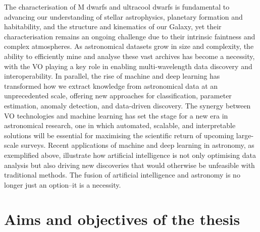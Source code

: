 The characterisation of M dwarfs and ultracool dwarfs is fundamental to advancing our understanding of stellar astrophysics, planetary formation and habitability, and the structure and kinematics of our Galaxy, yet their characterisation remains an ongoing challenge due to their intrinsic faintness and complex atmospheres. As astronomical datasets grow in size and complexity, the ability to efficiently mine and analyse these vast archives has become a necessity, with the VO playing a key role in enabling multi-wavelength data discovery and interoperability. In parallel, the rise of machine and deep learning has transformed how we extract knowledge from astronomical data at an unprecedented scale, offering new approaches for classification, parameter estimation, anomaly detection, and data-driven discovery. The synergy between VO technologies and machine learning has set the stage for a new era in astronomical research, one in which automated, scalable, and interpretable solutions will be essential for maximising the scientific return of upcoming large-scale surveys. Recent applications of machine and deep learning in astronomy, as exemplified above, illustrate how artificial intelligence is not only optimising data analysis but also driving new discoveries that would otherwise be unfeasible with traditional methods. The fusion of artificial intelligence and astronomy is no longer just an option--it is a necessity.


\section{Aims and objectives of the thesis} \label{sec:thesis_obj}


